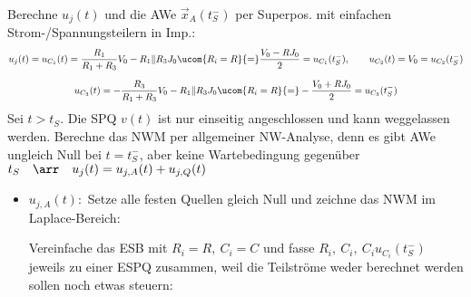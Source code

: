 \documentclass[ngerman,10pt,a4paper]{article}%
\begin{document}
\noindent Berechne $u_j(t)$ und die AWe $\vec{x}_A(t_S^-)$ per Superpos. mit einfachen Strom-/Spannungsteilern in Imp.:
\begin{gather}%
	\label{a1h_AWe} u_j(t)=u_{C_1}(t)=\frac{R_1}{R_1+R_3}V_0-R_1\|R_3J_0\ucom{R_i=R}{=}\frac{V_0-RJ_0}{2}=u_{C_1}(t_S^-),\qquad u_{C_2}(t)=V_0=u_{C_2}(t_S^-)\\[2.5mm]%
%
	\notag u_{C_3}(t)=-\frac{R_3}{R_1+R_3}V_0-R_1\|R_3J_0\ucom{R_i=R}{=}-\frac{V_0+RJ_0}{2}=u_{C_3}(t_S^-)%
\end{gather}%
%
Sei $t>t_S$. Die SPQ $v(t)$ ist nur einseitig angeschlossen und kann weggelassen werden. Berechne das NWM per allgemeiner NW-Analyse, denn es gibt AWe ungleich Null bei $t=t_S^-$, aber keine Wartebedingung gegenüber $t_S\quad\arr\quad u_j(t)=u_{j,A}(t)+u_{j,Q}(t)$
\begin{itemize}%
	\item $u_{j,A}(t):$ Setze alle festen Quellen gleich Null und zeichne das NWM im Laplace-Bereich:
	
	Vereinfache das ESB mit $R_i=R,\:C_i=C$ und fasse $R_i,\:C_i,\:C_iu_{C_i}(t_S^-)$ jeweils zu einer ESPQ zusammen, weil die Teilströme weder berechnet werden sollen noch etwas steuern:
	

\end{itemize}
\end{document}
